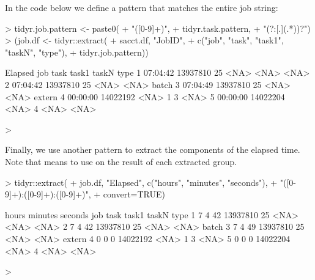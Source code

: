 In the code below we define a pattern that matches the entire job string:

\begin{Schunk}
\begin{Sinput}
> tidyr.job.pattern <- paste0(
+   "([0-9]+)", 
+   tidyr.task.pattern,
+   "(?:[.](.*))?")
> (job.df <- tidyr::extract(
+   sacct.df, "JobID", 
+   c("job", "task", "task1", "taskN", "type"), 
+   tidyr.job.pattern))
\end{Sinput}
\begin{Soutput}
   Elapsed      job task task1 taskN   type
1 07:04:42 13937810   25  <NA>  <NA>   <NA>
2 07:04:42 13937810   25  <NA>  <NA>  batch
3 07:04:49 13937810   25  <NA>  <NA> extern
4 00:00:00 14022192 <NA>     1     3   <NA>
5 00:00:00 14022204 <NA>     4  <NA>   <NA>
\end{Soutput}
\begin{Sinput}
> 
\end{Sinput}
\end{Schunk}

Finally, we use another pattern to extract the components of the
elapsed time. Note that  means to use
 on the result of each extracted group.

\begin{Schunk}
\begin{Sinput}
> tidyr::extract(
+   job.df, "Elapsed", c("hours", "minutes", "seconds"),
+   "([0-9]+):([0-9]+):([0-9]+)",
+   convert=TRUE)
\end{Sinput}
\begin{Soutput}
  hours minutes seconds      job task task1 taskN   type
1     7       4      42 13937810   25  <NA>  <NA>   <NA>
2     7       4      42 13937810   25  <NA>  <NA>  batch
3     7       4      49 13937810   25  <NA>  <NA> extern
4     0       0       0 14022192 <NA>     1     3   <NA>
5     0       0       0 14022204 <NA>     4  <NA>   <NA>
\end{Soutput}
\begin{Sinput}
> 
\end{Sinput}
\end{Schunk}

